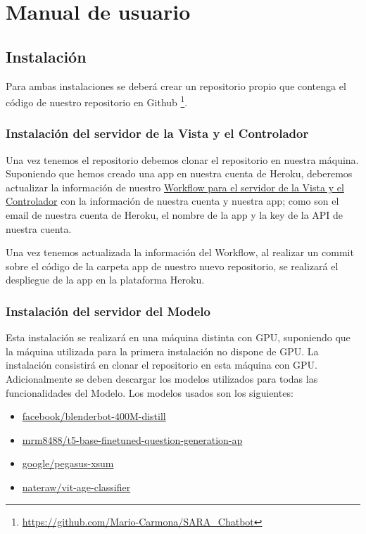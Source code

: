 \chapter{Manual de usuario}

\section{Instalación}

Para ambas instalaciones se deberá crear un repositorio propio que contenga el código de nuestro repositorio en Github \footnote{\url{https://github.com/Mario-Carmona/SARA_Chatbot}}. 

\subsection{Instalación del servidor de la Vista y el Controlador}

Una vez tenemos el repositorio debemos clonar el repositorio en nuestra máquina. Suponiendo que hemos creado una app en nuestra cuenta de Heroku, deberemos actualizar la información de nuestro \href{https://github.com/Mario-Carmona/SARA_Chatbot/blob/main/.github/workflows/controller_CI_CD.yml}{Workflow para el servidor de la Vista y el Controlador} con la información de nuestra cuenta y nuestra app; como son el email de nuestra cuenta de Heroku, el nombre de la app y la key de la API de nuestra cuenta.

Una vez tenemos actualizada la información del Workflow, al realizar un commit sobre el código de la carpeta app de nuestro nuevo repositorio, se realizará el despliegue de la app en la plataforma Heroku.

\subsection{Instalación del servidor del Modelo}

Esta instalación se realizará en una máquina distinta con GPU, suponiendo que la máquina utilizada para la primera instalación no dispone de GPU. La instalación consistirá en clonar el repositorio en esta máquina con GPU. Adicionalmente se deben descargar los modelos utilizados para todas las funcionalidades del Modelo. Los modelos usados son los siguientes:

\begin{itemize}
    \item \href{https://huggingface.co/facebook/blenderbot-400M-distill/tree/main}{facebook/blenderbot-400M-distill}
    \item \href{https://huggingface.co/mrm8488/t5-base-finetuned-question-generation-ap/tree/main}{mrm8488/t5-base-finetuned-question-generation-ap}
    \item \href{https://huggingface.co/google/pegasus-xsum/tree/main}{google/pegasus-xsum}
    \item \href{https://huggingface.co/nateraw/vit-age-classifier/tree/main}{nateraw/vit-age-classifier}
\end{itemize}

